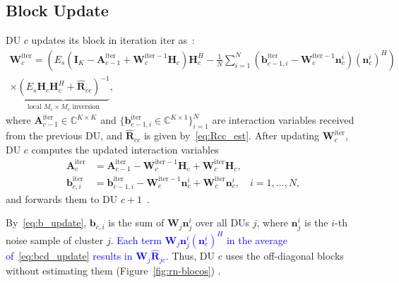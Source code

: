 \subsection{Block Update}\label{subsec:bcd}
DU $c$ updates its block in iteration $\mathrm{iter}$ as~\cite{zhao2021-globecom,zhao2025jsac}:
\begin{multline}
  \mathbf{W}_c^{\mathrm{iter}} = \left(
    E_s \left(\mathbf{I}_K - \mathbf{A}_{c-1}^{\mathrm{iter}}
    + \mathbf{W}_c^{\mathrm{iter}-1}\mathbf{H}_c\right)\mathbf{H}_c^H
    - \frac{1}{N}\sum_{i=1}^{N}
      \left(\mathbf{b}_{c-1,i}^{\mathrm{iter}} - \mathbf{W}_c^{\mathrm{iter}-1}\mathbf{n}_c^i\right)
      \left(\mathbf{n}_c^i\right)^H
  \right) \\
  \times
  \underbrace{
    \left(E_s \mathbf{H}_c \mathbf{H}_c^H
    + \hat{\mathbf{R}}_{cc}\right)^{-1}
  }_{\text{local } M_c \times M_c \text{ inversion}},
  \label{eq:bcd_update}
\end{multline}
where $\mathbf{A}_{c-1}^{\mathrm{iter}} \in \mathbb{C}^{K \times K}$ and
$\{\mathbf{b}_{c-1,i}^{\mathrm{iter}} \in \mathbb{C}^{K \times 1}\}_{i=1}^{N}$
are interaction variables received from the previous DU, and
$\hat{\mathbf{R}}_{cc}$ is given by~\eqref{eq:Rcc_est}. After updating $\mathbf{W}_c^{\mathrm{iter}}$,
DU $c$ computes the updated interaction variables
\begin{align}
  \mathbf{A}_c^{\mathrm{iter}} &= \mathbf{A}_{c-1}^{\mathrm{iter}}
    - \mathbf{W}_c^{\mathrm{iter}-1}\mathbf{H}_c
    + \mathbf{W}_c^{\mathrm{iter}}\mathbf{H}_c, \label{eq:A_update} \\
  \mathbf{b}_{c,i}^{\mathrm{iter}} &= \mathbf{b}_{c-1,i}^{\mathrm{iter}}
    - \mathbf{W}_c^{\mathrm{iter}-1}\mathbf{n}_c^i
    + \mathbf{W}_c^{\mathrm{iter}}\mathbf{n}_c^i, \quad i = 1,\ldots,N,
  \label{eq:b_update}
\end{align}
and forwards them to DU $c+1$~\cite{zhao2025jsac}.

By~\eqref{eq:b_update}, $\mathbf b_{c,i}$ is the sum of $\mathbf W_j\mathbf n_j^i$ over all DUs $j$, where $\mathbf n_j^i$ is the $i$-th noise sample of cluster $j$. \textcolor{blue}{Each term $\mathbf W_j\mathbf n_j^i(\mathbf n_c^i)^H$ in the average of~\eqref{eq:bcd_update} results in $\mathbf W_j\hat{\mathbf R}_{jc}$.} Thus, DU $c$ uses the off-diagonal blocks without estimating them (Figure~\ref{fig:rn-blocos}) \cite{zhao2025jsac}.


